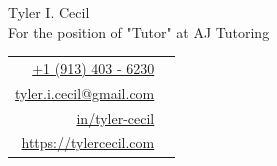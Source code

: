 \documentclass[sans, a4paper, 12pt]{article}
\newcommand{\cvcolor}[1]{{\color{MidnightBlue}#1}}
\begin{document}
\noindent
\begin{minipage}{0.675\linewidth}
  {
    \fontsize{40pt}{50pt}\selectfont
    \noindent
    Tyler I. Cecil
  }\\
  {\Large \color{darkgray}
    {
      \noindent
      For the position of "Tutor" at AJ Tutoring
    }
  }
\end{minipage}
\hfill
\begin{tabular}{|rl}
  \href{tel:+1 (913) 403 - 6230}{+1 (913) 403 - 6230}&\cvcolor{\faPhone} \\
  \href{mailto:tyler.i.cecil@gmail.com}{tyler.i.cecil@gmail.com}&\cvcolor{\faEnvelope} \\
  \href{https://www.linkedin.com/in/tyler-cecil/}{in/tyler-cecil}&\cvcolor{\faLinkedinSquare} \\
  \href{https://tylercecil.com}{https://tylercecil.com}&\cvcolor{\faGlobe} \\
\end{tabular}

\vspace{0.5em}
\noindent\hrulefill
\vspace{1em}
\end{document}
